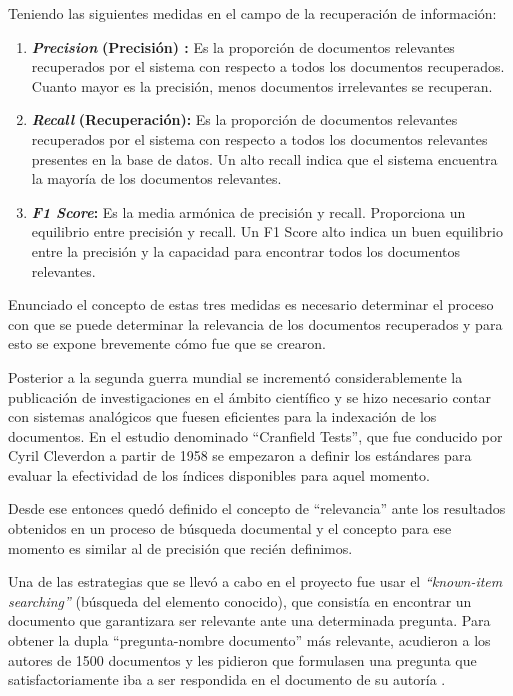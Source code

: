 \documentclass[
  10,
  openany]{book}
\begin{document}
Teniendo las siguientes medidas en el campo de la recuperación de información:

\begin{enumerate}
\def\labelenumi{\arabic{enumi}.}
\item
  \textbf{\emph{Precision}} \textbf{(Precisión) :} Es la proporción de documentos relevantes recuperados por el sistema con respecto a todos los documentos recuperados. Cuanto mayor es la precisión, menos documentos irrelevantes se recuperan.
\item
  \textbf{\emph{Recall}} \textbf{(Recuperación):} Es la proporción de documentos relevantes recuperados por el sistema con respecto a todos los documentos relevantes presentes en la base de datos. Un alto recall indica que el sistema encuentra la mayoría de los documentos relevantes.
\item
  \textbf{\emph{F1 Score}:} Es la media armónica de precisión y recall. Proporciona un equilibrio entre precisión y recall. Un F1 Score alto indica un buen equilibrio entre la precisión y la capacidad para encontrar todos los documentos relevantes.
\end{enumerate}

Enunciado el concepto de estas tres medidas es necesario determinar el proceso con que se puede determinar la relevancia de los documentos recuperados y para esto se expone brevemente cómo fue que se crearon.

Posterior a la segunda guerra mundial se incrementó considerablemente la publicación de investigaciones en el ámbito científico y se hizo necesario contar con sistemas analógicos que fuesen eficientes para la indexación de los documentos. En el estudio denominado ``Cranfield Tests''\citep{harman2011}, que fue conducido por Cyril Cleverdon a partir de 1958 se empezaron a definir los estándares para evaluar la efectividad de los índices disponibles para aquel momento.

Desde ese entonces quedó definido el concepto de ``relevancia'' ante los resultados obtenidos en un proceso de búsqueda documental y el concepto para ese momento es similar al de precisión que recién definimos.

Una de las estrategias que se llevó a cabo en el proyecto fue usar el \emph{``known-item searching''} (búsqueda del elemento conocido), que consistía en encontrar un documento que garantizara ser relevante ante una determinada pregunta. Para obtener la dupla ``pregunta-nombre documento'' más relevante, acudieron a los autores de 1500 documentos y les pidieron que formulasen una pregunta que satisfactoriamente iba a ser respondida en el documento de su autoría \citep{harman2011}.
\end{document}
